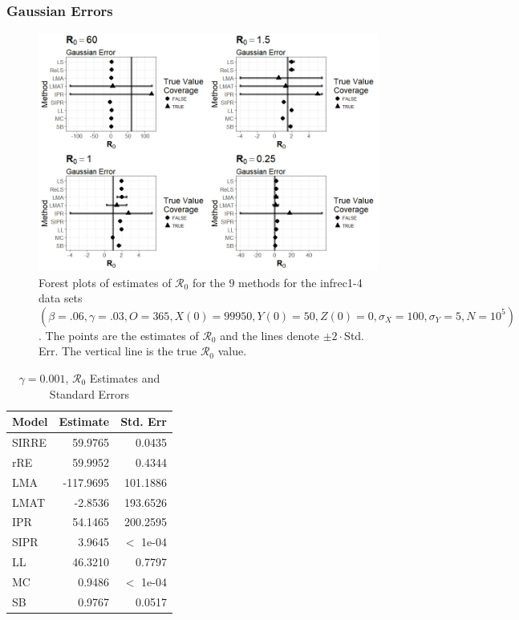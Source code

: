 \documentclass[12pt]{article}
\newcommand{\xxsir}{\ensuremath{9} } %
\newcommand{\rr}{\ensuremath{\mathcal{R}_0}}
\begin{document}
\subsubsection{Gaussian Errors}

\begin{figure}[H]
  \centering
  \includegraphics[scale=0.5]{images/parchange_n.jpeg}
  \caption{Forest plots of estimates of $\rr$ for the \xxsir methods for the infrec1-4 data sets $(\beta=.06, \gamma=.03, O=365, X(0)=99950, Y(0)=50, Z(0)=0, \sigma_X=100, \sigma_Y=5, N=10^5)$.  The points are the estimates of $\rr$ and the lines denote $\pm 2\cdot $Std. Err.  The vertical line is the true $\rr$ value.}
  \label{fig:infrec1-res}
\end{figure}
\begin{table}[H]

	\centering
	\begin{tabular}[t]{l|r|r}
		\hline
		Model & Estimate & Std. Err\\
		\hline
		SIRRE & 59.9765 & 0.0435\\
		\hline
		rRE & 59.9952 & 0.4344\\
		\hline
		LMA &  -117.9695 & 101.1886 \\
		\hline
		LMAT & -2.8536 & 193.6526 \\
		\hline
		IPR & 54.1465 & 200.2595\\
		\hline
		SIPR & 3.9645 & $<$ 1e-04\\
		\hline
		LL & 46.3210 & 0.7797\\
		\hline
		MC & 0.9486 & $<$ 1e-04 \\
		\hline
		SB & 0.9767 & 0.0517\\
		\hline
	\end{tabular}
        \caption{\label{tab:infrec1-res}$\gamma = 0.001$, $\rr$ Estimates and Standard Errors}
\end{table}
\end{document}
